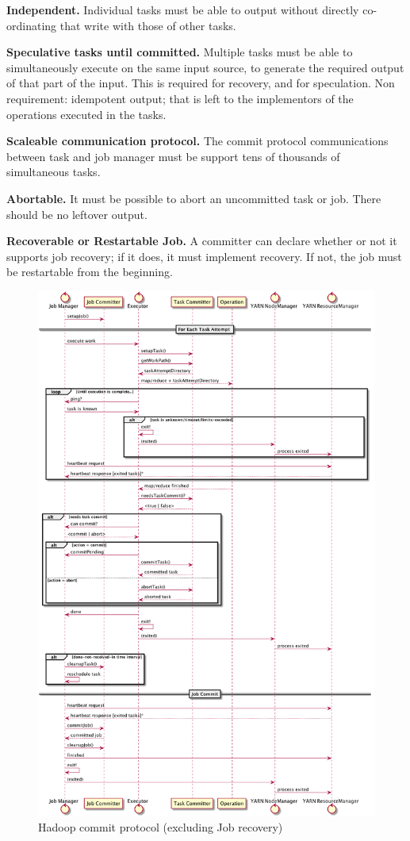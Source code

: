 \documentclass[conference]{IEEEtran}
\begin{document}
\textbf{Independent.}
Individual tasks must be able to output without directly
co-ordinating that write with those of other tasks.

\textbf{Speculative tasks until committed.}
Multiple tasks must be able to simultaneously execute on the same input
source, to generate the required output of that part of the input.
This is required for recovery, and for speculation.
Non requirement: idempotent output;
that is left to the implementors of the operations executed in the tasks.

\textbf{Scaleable communication protocol.}
The commit protocol communications between task and job manager
must be support tens of thousands of simultaneous tasks.

\textbf{Abortable.}
It must be possible to abort an uncommitted task or job.
There should be no leftover output.

\textbf{Recoverable or Restartable Job.}
A committer can declare whether or not it supports job recovery;
if it does, it must implement recovery.
If not, the job must be restartable from the beginning.

\begin{figure}
  \centering
  \includegraphics[width=.8\textwidth]{commit-protocol.png}
  \caption{Hadoop commit protocol (excluding Job recovery)}
  \label{fig:commit-protocol}
\end{figure}
\end{document}
